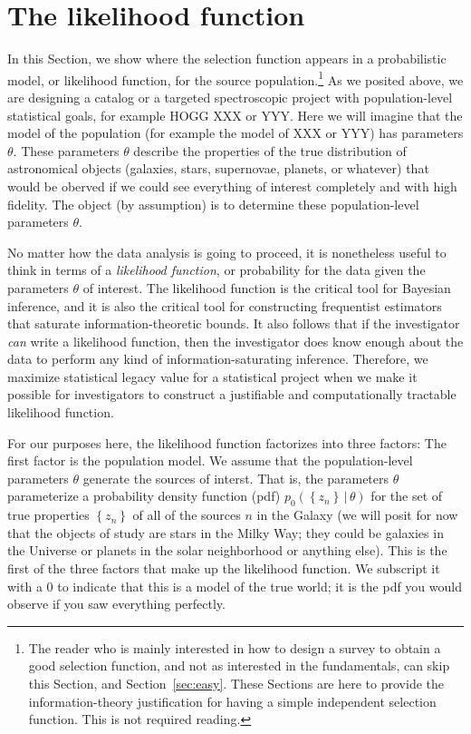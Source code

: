 \documentclass[modern]{aastex62}
\newcommand{\given}{\,|\,}
\newcommand{\set}[1]{\left\{{#1}\right\}}
\newcommand{\sectionname}{Section}
\begin{document}
\section{The likelihood function}\label{sec:lf}

In this \sectionname, we show where the selection function appears in
a probabilistic model, or likelihood function, for the source
population.\footnote{The reader who is mainly interested in how to
  design a survey to obtain a good selection function, and not as
  interested in the fundamentals, can skip this \sectionname, and
  \sectionname~\ref{sec:easy}.  These \sectionname s are here to
  provide the information-theory justification for having a simple
  independent selection function.  This is not required reading.}
As we posited above, we are designing a catalog or a targeted
spectroscopic project
with population-level statistical goals, for example HOGG XXX or YYY.
Here we will imagine that the model of the population (for example the model
of XXX or YYY) has parameters $\theta$.
These parameters $\theta$ describe the properties of the true distribution
of astronomical objects (galaxies, stars, supernovae, planets, or whatever)
that would be oberved if we could see everything of interest completely and
with high fidelity.
The object (by assumption) is to determine these population-level parameters
$\theta$.

No matter how the data analysis is going to proceed, it is nonetheless
useful to think in
terms of a \emph{likelihood function}, or probability for the data given
the parameters $\theta$ of interest.
The likelihood function is the critical tool for Bayesian inference, and
it is also the critical tool for constructing frequentist estimators that
saturate information-theoretic bounds.
It also follows that if the investigator \emph{can} write a likelihood
function, then the investigator does know enough about the data to perform
any kind of information-saturating inference.
Therefore, we maximize statistical legacy value for a statistical project
when we make it possible for investigators to construct a justifiable and
computationally tractable likelihood function.

For our purposes here, the likelihood function factorizes into three
factors:
The first factor is the population model.
We assume that the population-level parameters $\theta$ generate the
sources of interst.
That is, the parameters $\theta$ parameterize a probability density
function (pdf) $p_0(\set{z_n}\given\theta)$
for the set of true properties $\set{z_n}$ of all of the sources $n$
in the Galaxy (we will posit for now that the objects of study are
stars in the Milky Way; they could be galaxies in the Universe or
planets in the solar neighborhood or anything else).
This is the first of the three factors that make up the likelihood
function.
We subscript it with a $0$ to indicate that
this is a model of the true world;
it is the pdf you would observe if you saw everything perfectly.
\end{document}
